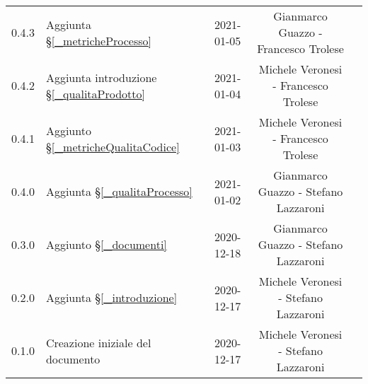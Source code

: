 \begin{center}
\begin{longtable}{|c|p{5cm}|c|c|c|}
	0.4.3 & Aggiunta \S\ref{_metricheProcesso} & 2021-01-05 & Gianmarco Guazzo - Francesco Trolese \\
	0.4.2 & Aggiunta introduzione \S\ref{_qualitaProdotto}& 2021-01-04 & Michele Veronesi - Francesco Trolese \\
	0.4.1 & Aggiunto \S\ref{_metricheQualitaCodice} & 2021-01-03 & Michele Veronesi - Francesco Trolese \\
	0.4.0 & Aggiunta \S\ref{_qualitaProcesso} & 2021-01-02 & Gianmarco Guazzo - Stefano Lazzaroni \\
	0.3.0 & Aggiunto \S\ref{_documenti} & 2020-12-18 & Gianmarco Guazzo - Stefano Lazzaroni \\
	0.2.0 & Aggiunta \S\ref{_introduzione} & 2020-12-17 &  Michele Veronesi - Stefano Lazzaroni\\
    0.1.0 & Creazione iniziale del documento & 2020-12-17 & Michele Veronesi - Stefano Lazzaroni\\
	\hline

	\end{longtable}
\end{center}